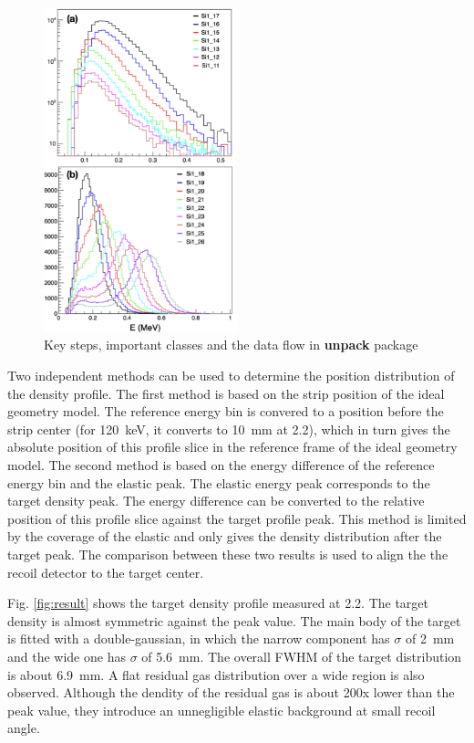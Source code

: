 \documentclass[fleqn,twocolumn,a4paper]{ikpar}
\begin{document}
\begin{figure}[!htb]
	\includegraphics[width=0.5\textwidth]{./spectrums_aggregate.png}
  	\caption{Key steps, important classes and the data flow in \textbf{unpack} package}
  	\label{fig:unpack_design}
\end{figure}

Two independent methods can be used to determine the position distribution of the density profile.
The first method is based on the strip position of the ideal geometry model.
The reference energy bin is convered to a position before the strip center (for
\SI{120}{\keV}, it converts to \SI{10}{\mm} at \SI{2.2}{\momentum}), which in turn
gives the absolute position of this profile slice in the reference frame of the
ideal geometry model.
The second method is based on the energy difference of the reference energy bin
and the elastic peak.
The elastic energy peak corresponds to the target density peak.
The energy difference can be converted to the relative position of this profile
slice against the target profile peak.
This method is limited by the coverage of the elastic and only gives the density distribution after the target peak.
The comparison between these two results is used to align the the recoil
detector to the target center.
\par
\medskip

Fig. \ref{fig:result} shows the target density profile measured at
\SI{2.2}{\momentum}.
The target density is almost symmetric against the peak value.
The main body of the target is fitted with a double-gaussian, in which the
narrow component has $\sigma$ of \SI{2}{mm} and the wide one has $\sigma$ of \SI{5.6}{mm}.
The overall FWHM of the target distribution is about \SI{6.9}{mm}.
A flat residual gas distribution over a wide region is also observed.
Although the dendity of the residual gas is about 200x lower than the peak
value, they introduce an unnegligible elastic background at small recoil angle.
\end{document}

